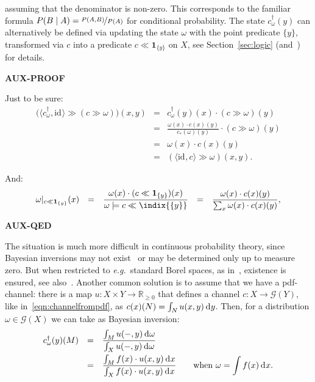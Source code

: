 \documentclass{mscs}
\newcommand{\auxprooffont}{\small}
\newenvironment{Auxproof}
  {\par\auxprooffont\noindent\textbf{AUX-PROOF}\dotfill\par
    \noindent\ignorespaces}
  {\par\noindent\textbf{AUX-QED}\dotfill\par
    \noindent\ignorespacesafterend}
\newcommand{\idmap}[1][]{\ensuremath{\mathrm{id}_{#1}}}
\newcommand{\Giry}{\mathcal{G}}
\newcommand{\R}{\mathbb{R}}
\newcommand{\tuple}[1]{\langle#1\rangle}
\newcommand{\intd}{{\kern.2em}\mathrm{d}{\kern.03em}}
\newcommand{\indic}[1]{\mathbf{1}_{#1}}
\begin{document}
\noindent assuming that the denominator is non-zero. This corresponds
to the familiar formula $P(B\mid A) = \nicefrac{P(A,B)}{P(A)}$ for
conditional probability. The state $c^{\dag}_{\omega}(y)$ can
alternatively be defined via updating the state $\omega$ with the
point predicate $\{y\}$, transformed via $c$ into a predicate $c \ll
\indic{\{y\}}$ on $X$, see Section~\ref{sec:logic}
(and~\cite{JacobsZ16}) for details.

\begin{Auxproof}
Just to be sure:
\[ \begin{array}{rcl}
\big(\tuple{c^{\dag}_{\omega}, \idmap} \gg (c \gg \omega)\big)(x,y)
& = &
c^{\dag}_{\omega}(y)(x)\cdot (c \gg \omega)(y)
\\
& = &
\displaystyle\frac{\omega(x)\cdot c(x)(y)}{c_{*}(\omega)(y)} \cdot
   (c \gg \omega)(y)
\\
& = &
\omega(x)\cdot c(x)(y)
\\
& = &
(\tuple{\idmap,c} \gg \omega)(x,y).
\end{array} \]

\noindent And:
\[ \begin{array}{rcccl}
\omega|_{c \ll \indic{\{y\}}}(x)
& = &
\displaystyle\frac{\omega(x) \cdot (c \ll \indic{\{y\}})(x)}{\omega 
   \models c \ll \indix{\{y\}}}
& = &
\displaystyle\frac{\omega(x)\cdot c(x)(y)}{\sum_{x}\omega(x)\cdot c(x)(y)},
\end{array} \]
\end{Auxproof}

The situation is much more difficult in continuous probability theory,
since Bayesian inversions may not exist~\cite{AckermanFR11,Stoyanov14}
or may be determined only up to measure zero. But when restricted to
\textit{e.g.}~standard Borel spaces, as in~\cite{ClercDDG17},
existence is ensured, see also~\cite{Faden85,CulbertsonS14}. Another
common solution is to assume that we have a pdf-channel: there is a
map $u\colon X\times Y \rightarrow \R_{\geq 0}$ that defines a channel
$c \colon X \rightarrow \Giry(Y)$, like in~\eqref{eqn:channelfrompdf},
as $c(x)(N) = \int_{N} u(x,y)\intd y$.  Then, for a distribution
$\omega\in\Giry(X)$ we can take as Bayesian inversion:
\begin{equation}
\label{eqn:continuousinversion}
\begin{array}{rcl}
c^{\dag}_{\omega}(y)(M)
& = &
\displaystyle\frac{\int_{M} u(-,y)\intd \omega}{\int_{X} u(-,y)\intd \omega}
\\[+1em]
& = &
\displaystyle\frac{\int_{M} f(x)\cdot u(x,y) \intd x}
   {\int_{X} f(x) \cdot u(x,y) \intd x}
   \qquad \mbox{when } \omega = \int f(x)\intd x.
\end{array}
\end{equation}
\end{document}
